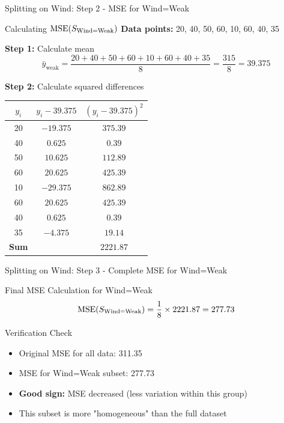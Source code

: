 \documentclass[usenames,dvipsnames]{beamer}
\begin{document}
\begin{frame}{Splitting on Wind: Step 2 - MSE for Wind=Weak}
\begin{examplebox}{Calculating $\operatorname{MSE}(S_{\text{Wind=Weak}})$}
\textbf{Data points:} 20, 40, 50, 60, 10, 60, 40, 35

\pause
\textbf{Step 1:} Calculate mean
\[
\bar{y}_{\text{weak}} = \frac{20 + 40 + 50 + 60 + 10 + 60 + 40 + 35}{8} = \frac{315}{8} = 39.375
\]

\pause
\textbf{Step 2:} Calculate squared differences
\scriptsize
\begin{tabular}{|c|c|c|}
\hline
$y_i$ & $y_i - 39.375$ & $(y_i - 39.375)^2$ \\ \hline
20 & $-19.375$ & $375.39$ \\
40 & $0.625$ & $0.39$ \\
50 & $10.625$ & $112.89$ \\
60 & $20.625$ & $425.39$ \\
10 & $-29.375$ & $862.89$ \\
60 & $20.625$ & $425.39$ \\
40 & $0.625$ & $0.39$ \\
35 & $-4.375$ & $19.14$ \\ \hline
\textbf{Sum} & & $\mathbf{2221.87}$ \\
\hline
\end{tabular}
\end{examplebox}
\end{frame}

\begin{frame}{Splitting on Wind: Step 3 - Complete MSE for Wind=Weak}
\begin{examplebox}{Final MSE Calculation for Wind=Weak}
\[
\operatorname{MSE}(S_{\text{Wind=Weak}}) = \frac{1}{8} \times 2221.87 = 277.73
\]
\end{examplebox}

\pause
\begin{examplebox}{Verification Check}
\begin{itemize}
	\item Original MSE for all data: 311.35
	\item MSE for Wind=Weak subset: 277.73
	\item \textbf{Good sign:} MSE decreased (less variation within this group)
	\item This subset is more "homogeneous" than the full dataset
\end{itemize}
\end{examplebox}
\end{frame}
\end{document}
